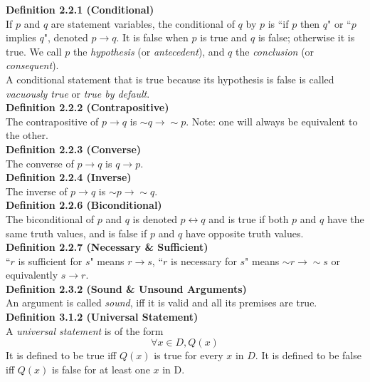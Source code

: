 \documentclass[a4paper]{article}
\newcommand{\subheading}[1]{{\scriptsize\textbf{#1}}}
\begin{document}
\begin{multicols*}{4}
\subheading{Definition 2.2.1 (Conditional)}\\
If $p$ and $q$ are statement variables, the conditional of $q$ by $p$ is ``if
$p$ then $q$" or ``$p$ implies $q$", denoted $p \rightarrow q$. It is false
when $p$ is true and $q$ is false; otherwise it is true. We call $p$ the
\textit{hypothesis} (or \textit{antecedent}), and $q$ the \textit{conclusion}
(or \textit{consequent}).\\

A conditional statement that is true because its hypothesis is false is called
\textit{vacuously true} or \textit{true by default}.\\

\subheading{Definition 2.2.2 (Contrapositive)}\\
The contrapositive of $p \rightarrow q$ is $\sim q \rightarrow \sim p$. Note: one will always be equivalent to the other.\\

\subheading{Definition 2.2.3 (Converse)}\\
The converse of $p \rightarrow q$ is $q \rightarrow p$.\\

\subheading{Definition 2.2.4 (Inverse)}\\
The inverse of $p \rightarrow q$ is $\sim p \rightarrow \sim q$.\\

\subheading{Definition 2.2.6 (Biconditional)}\\
The biconditional of $p$ and $q$ is denoted $p \leftrightarrow q$ and is true if
both $p$ and $q$ have the same truth values, and is false if $p$ and $q$ have
opposite truth values.\\

\subheading{Definition 2.2.7 (Necessary \& Sufficient)}\\
``$r$ is sufficient for $s$" means $r \rightarrow s$, ``$r$ is necessary for
$s$" means $\sim r \rightarrow \sim s$ or equivalently $s \rightarrow r$.\\

\subheading{Definition 2.3.2 (Sound \& Unsound Arguments)}\\
An argument is called \textit{sound}, iff it is valid and all its premises are
true.\\

\subheading{Definition 3.1.2 (Universal Statement)}\\
A \textit{universal statement} is of the form $$\forall x \in D, Q(x)$$ It is
defined to be true iff $Q(x)$ is true for every $x$ in $D$. It is defined to be
false iff $Q(x)$ is false for at least one $x$ in D.\\


\end{multicols*}
\end{document}
